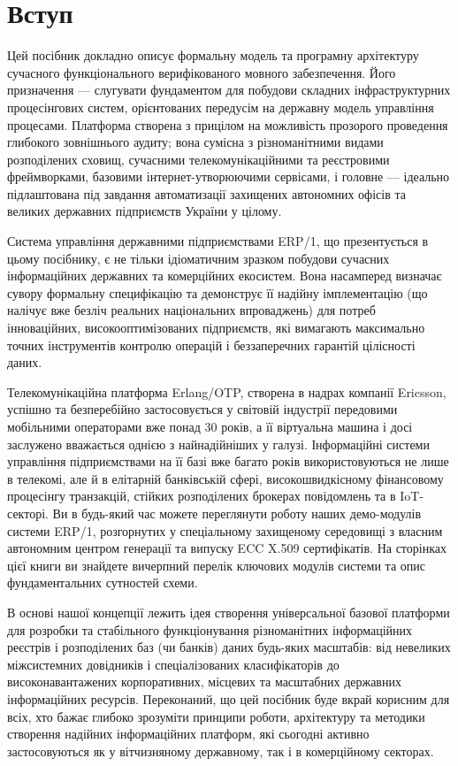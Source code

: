 \chapter{Вступ}

Цей посібник докладно описує формальну модель та програмну архітектуру сучасного функціонального верифікованого мовного забезпечення. Його призначення — слугувати фундаментом для побудови складних інфраструктурних процесінгових систем, орієнтованих передусім на державну модель управління процесами. Платформа створена з прицілом на можливість прозорого проведення глибокого зовнішнього аудиту; вона сумісна з різноманітними видами розподілених сховищ, сучасними телекомунікаційними та реєстровими фреймворками, базовими інтернет-утворюючими сервісами, і головне — ідеально підлаштована під завдання автоматизації захищених автономних офісів та великих державних підприємств України у цілому.

Система управління державними підприємствами ERP/1, що презентується в цьому посібнику, є не тільки ідіоматичним зразком побудови сучасних інформаційних державних та комерційних екосистем. Вона насамперед визначає сувору формальну специфікацію та демонструє її надійну імплементацію (що налічує вже безліч реальних національних впроваджень) для потреб інноваційних, високооптимізованих підприємств, які вимагають максимально точних інструментів контролю операцій і беззаперечних гарантій цілісності даних.

Телекомунікаційна платформа Erlang/OTP, створена в надрах компанії Ericsson, успішно та безперебійно застосовується у світовій індустрії передовими мобільними операторами вже понад 30 років, а її віртуальна машина і досі заслужено вважається однією з найнадійніших у галузі. Інформаційні системи управління підприємствами на її базі вже багато років використовуються не лише в телекомі, але й в елітарній банківській сфері, високошвидкісному фінансовому процесінгу транзакцій, стійких розподілених брокерах повідомлень та в IoT-секторі. Ви в будь-який час можете переглянути роботу наших демо-модулів системи ERP/1, розгорнутих у спеціальному захищеному середовищі з власним автономним центром генерації та випуску ECC X.509 сертифікатів. На сторінках цієї книги ви знайдете вичерпний перелік ключових модулів системи та опис фундаментальних сутностей схеми.

В основі нашої концепції лежить ідея створення універсальної базової платформи для розробки та стабільного функціонування різноманітних інформаційних реєстрів і розподілених баз (чи банків) даних будь-яких масштабів: від невеликих міжсистемних довідників і спеціалізованих класифікаторів до високонавантажених корпоративних, місцевих та масштабних державних інформаційних ресурсів. Переконаний, що цей посібник буде вкрай корисним для всіх, хто бажає глибоко зрозуміти принципи роботи, архітектуру та методики створення надійних інформаційних платформ, які сьогодні активно застосовуються як у вітчизняному державному, так і в комерційному секторах.

